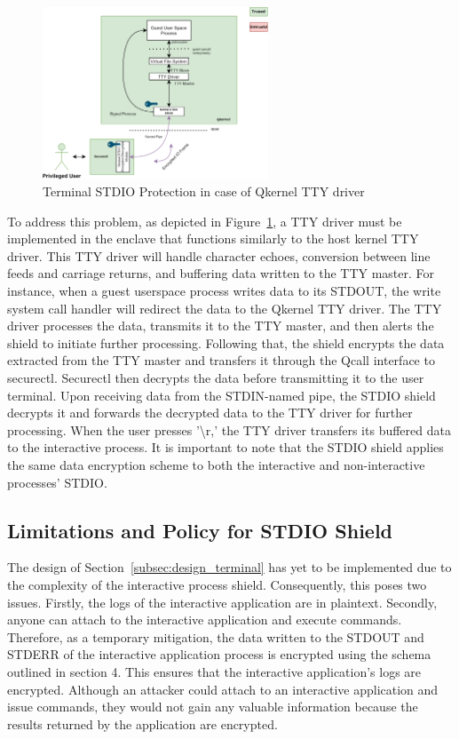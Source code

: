 \begin{figure}[!htb]
    \centering
    \includegraphics[width=0.6\textwidth]{images/terminal_shiled3.png}
    \caption[Terminal STDIO Protection in case of using Qkernel TTY driver]{Terminal STDIO Protection in case of Qkernel TTY driver}
    \label{fig:terminal_shiled3}
\end{figure}

To address this problem, as depicted in Figure~\ref{fig:terminal_shiled3}, a TTY driver must be implemented in the enclave that functions similarly to the host kernel TTY driver. This TTY driver will handle character echoes, conversion between line feeds and carriage returns, and buffering data written to the TTY master. For instance, when a guest userspace 
process writes data to its STDOUT, the write system call handler will redirect the data to the Qkernel TTY driver. The TTY driver processes the data, transmits it to the TTY master, and then alerts the shield to initiate further processing. Following that, the shield encrypts the data extracted from the TTY master and transfers it through the Qcall interface to 
securectl.  Securectl then decrypts the data before transmitting it to the user terminal. Upon receiving data from the STDIN-named pipe, the STDIO shield decrypts it and forwards the decrypted data to the TTY driver for further processing. When the user presses '\textbackslash r,' the TTY driver transfers its buffered data to the interactive process. It is important to note 
that the STDIO shield applies the same data encryption scheme to both the interactive and non-interactive processes' STDIO.

\subsection{Limitations and Policy for STDIO Shield}
The design of Section~\ref{subsec:design_terminal} has yet to be implemented due to the complexity of the interactive process shield. Consequently, this poses two issues. Firstly, the logs of the interactive application are in plaintext. Secondly, anyone can attach to the interactive application and execute commands. Therefore, as a temporary mitigation, the data written to the STDOUT 
and STDERR of the interactive application process is encrypted using the schema outlined in section 4. This ensures that the interactive application's logs are encrypted. Although an attacker could attach to an interactive application and issue commands, they would not gain any valuable information because the results returned by the application are encrypted.
 
